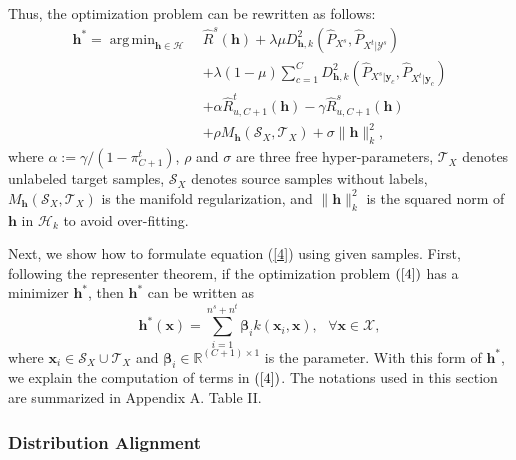 \documentclass[journal]{IEEEtran}
\DeclareMathOperator*{\argmin}{arg\,min}
\begin{document}
Thus, the optimization problem can be rewritten as follows: 
\begin{equation}
  \begin{split}
    {\bm h}^*=\argmin_{{\bm h}\in \mathcal{H}} ~ &\widehat{R}^s({\bm h})
    +\lambda \mu D^2_{{\bm h},k}(\widehat{P}_{X^s},\widehat{P}_{X^t|\mathcal{Y}^s})
    \\
    &+\lambda (1-\mu)\sum_{c=1}^C D^2_{{\bm h},k}(\widehat{P}_{X^s|{\mathbf{y}}_c},\widehat{P}_{X^t|{\mathbf{y}}_c})
    \\
    &+\alpha\widehat{R}^t_{u,C+1}({\bm h})
 -\gamma \widehat{R}^s_{u,C+1}({\bm h})
 \\
 &+ \rho M_{\bm h}(\mathcal{S}_X,\mathcal{T}_X)+\sigma \|{\bm h}\|_k^2,
    \end{split}\label{4}
\end{equation}
where $\alpha := \gamma/(1-\pi^t_{C+1})$, $\rho$ and $\sigma$ are three free hyper-parameters, $\mathcal{T}_X$ denotes unlabeled target samples, $\mathcal{S}_X$ denotes source samples without labels, $M_{\bm h}(\mathcal{S}_X,\mathcal{T}_X)$ is the manifold regularization, and $\|{\bm h}\|_k^2$ is the squared norm of ${\bm h}$ in $\mathcal{H}_k$ to avoid over-fitting. 


Next, we show how to formulate equation (\ref{4}) using given samples. First, 
following the representer theorem, if the optimization problem $(\ref{4})$ has a minimizer ${\bm h}^*$, then ${\bm h}^*$ can be written as 
\begin{equation*}
{\bm h}^*(\mathbf{x})=\sum_{i=1}^{n^s+n^t}{\boldsymbol{\beta}}_ik(\mathbf{x}_i,\mathbf{x}),~~~\forall \mathbf{x} \in \mathcal{X}, 
\end{equation*}
where $\mathbf{x}_i\in \mathcal{S}_X\cup \mathcal{T}_X$ and ${\bm{\bm \beta}}_i \in \mathbb{R}^{{(C+1)}\times {1}}$ is the parameter. With this form of ${\bm h}^*$, we explain the computation of terms in $(\ref{4})$. The notations used in this section are summarized in Appendix A. Table II.


\subsubsection{Distribution Alignment} 
\end{document}
